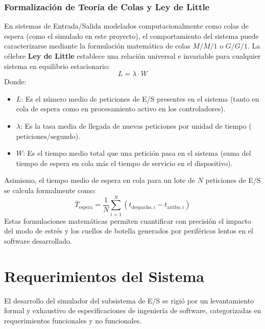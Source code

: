 \documentclass[11pt,letterpaper]{article}
\begin{document}
\subsubsection{Formalización de Teoría de Colas y Ley de Little}
En sistemas de Entrada/Salida modelados computacionalmente como colas de espera (como el simulado en este proyecto), el comportamiento del sistema puede caracterizarse mediante la formulación matemática de colas $M/M/1$ o $G/G/1$. La célebre \textbf{Ley de Little} establece una relación universal e invariable para cualquier sistema en equilibrio estacionario:
\begin{equation}
    L = \lambda \cdot W
\end{equation}
Donde:
\begin{itemize}
    \item $L$: Es el número medio de peticiones de E/S presentes en el sistema (tanto en cola de espera como en procesamiento activo en los controladores).
    \item $\lambda$: Es la tasa media de llegada de nuevas peticiones por unidad de tiempo ($\text{peticiones/segundo}$).
    \item $W$: Es el tiempo medio total que una petición pasa en el sistema (suma del tiempo de espera en cola más el tiempo de servicio en el dispositivo).
\end{itemize}

Asimismo, el tiempo medio de espera en cola para un lote de $N$ peticiones de E/S se calcula formalmente como:
\begin{equation}
    \bar{T}_{\text{espera}} = \frac{1}{N} \sum_{i=1}^{N} \left( t_{\text{despacho}, i} - t_{\text{arribo}, i} \right)
\end{equation}
Estas formulaciones matemáticas permiten cuantificar con precisión el impacto del modo de estrés y los cuellos de botella generados por periféricos lentos en el software desarrollado.

\section{Requerimientos del Sistema}

El desarrollo del simulador del subsistema de E/S se rigió por un levantamiento formal y exhaustivo de especificaciones de ingeniería de software, categorizadas en requerimientos funcionales y no funcionales.
\end{document}
